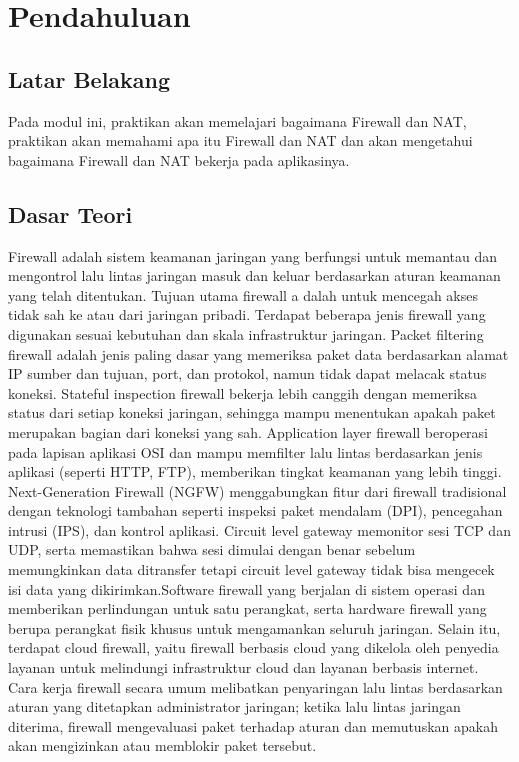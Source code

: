\section{Pendahuluan}
\subsection{Latar Belakang}
Pada modul ini, praktikan akan memelajari bagaimana Firewall dan NAT, praktikan akan memahami apa itu 
Firewall dan NAT dan akan mengetahui bagaimana Firewall dan NAT bekerja pada aplikasinya.

\subsection{Dasar Teori}
Firewall adalah sistem keamanan jaringan yang berfungsi untuk memantau dan mengontrol lalu lintas 
jaringan masuk dan keluar berdasarkan aturan keamanan yang telah ditentukan. Tujuan utama firewall a
dalah untuk mencegah akses tidak sah ke atau dari jaringan pribadi. Terdapat beberapa jenis firewall 
yang digunakan sesuai kebutuhan dan skala infrastruktur jaringan. Packet filtering firewall adalah 
jenis paling dasar yang memeriksa paket data berdasarkan alamat IP sumber dan tujuan, port, dan 
protokol, namun tidak dapat melacak status koneksi. Stateful inspection firewall bekerja lebih 
canggih dengan memeriksa status dari setiap koneksi jaringan, sehingga mampu menentukan 
apakah paket merupakan bagian dari koneksi yang sah. Application layer firewall beroperasi pada 
lapisan aplikasi OSI dan mampu memfilter lalu lintas berdasarkan jenis aplikasi (seperti HTTP, FTP), 
memberikan tingkat keamanan yang lebih tinggi. Next-Generation Firewall (NGFW) menggabungkan fitur 
dari firewall tradisional dengan teknologi tambahan seperti inspeksi paket mendalam (DPI), pencegahan 
intrusi (IPS), dan kontrol aplikasi. Circuit level gateway memonitor sesi TCP dan UDP, serta 
memastikan bahwa sesi dimulai dengan benar sebelum memungkinkan data ditransfer tetapi circuit level 
gateway tidak bisa mengecek isi data yang dikirimkan.Software firewall yang berjalan di sistem operasi 
dan memberikan perlindungan untuk satu perangkat, serta hardware firewall yang berupa perangkat fisik 
khusus untuk mengamankan seluruh jaringan. Selain itu, terdapat cloud firewall, yaitu firewall 
berbasis cloud yang dikelola oleh penyedia layanan untuk melindungi infrastruktur cloud dan layanan 
berbasis internet. Cara kerja firewall secara umum melibatkan penyaringan lalu lintas berdasarkan 
aturan yang ditetapkan administrator jaringan; ketika lalu lintas jaringan diterima, firewall 
mengevaluasi paket terhadap aturan dan memutuskan apakah akan mengizinkan atau memblokir paket 
tersebut.

